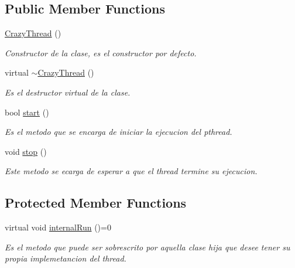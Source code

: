 \subsection*{Public Member Functions}
\begin{DoxyCompactItemize}
\item 
\hypertarget{class_crazy_thread_a0e0ca1644ff99dc033d11a58e0e54cd8}{\hyperlink{class_crazy_thread_a0e0ca1644ff99dc033d11a58e0e54cd8}{Crazy\-Thread} ()}\label{class_crazy_thread_a0e0ca1644ff99dc033d11a58e0e54cd8}

\begin{DoxyCompactList}\small\item\em Constructor de la clase, es el constructor por defecto. \end{DoxyCompactList}\item 
\hypertarget{class_crazy_thread_a46e62f5a5f328d329b5b14edc693fd77}{virtual \hyperlink{class_crazy_thread_a46e62f5a5f328d329b5b14edc693fd77}{$\sim$\-Crazy\-Thread} ()}\label{class_crazy_thread_a46e62f5a5f328d329b5b14edc693fd77}

\begin{DoxyCompactList}\small\item\em Es el destructor virtual de la clase. \end{DoxyCompactList}\item 
bool \hyperlink{class_crazy_thread_a2f355e56337c7f4b3f627633f51f9388}{start} ()
\begin{DoxyCompactList}\small\item\em Es el metodo que se encarga de iniciar la ejecucion del pthread. \end{DoxyCompactList}\item 
\hypertarget{class_crazy_thread_acd83eb404d4edc6db97f307aead10a32}{void \hyperlink{class_crazy_thread_acd83eb404d4edc6db97f307aead10a32}{stop} ()}\label{class_crazy_thread_acd83eb404d4edc6db97f307aead10a32}

\begin{DoxyCompactList}\small\item\em Este metodo se ecarga de esperar a que el thread termine su ejecucion. \end{DoxyCompactList}\end{DoxyCompactItemize}
\subsection*{Protected Member Functions}
\begin{DoxyCompactItemize}
\item 
\hypertarget{class_crazy_thread_ac55ecbf9e17716a6dd9acd3f22e4ad80}{virtual void \hyperlink{class_crazy_thread_ac55ecbf9e17716a6dd9acd3f22e4ad80}{internal\-Run} ()=0}\label{class_crazy_thread_ac55ecbf9e17716a6dd9acd3f22e4ad80}

\begin{DoxyCompactList}\small\item\em Es el metodo que puede ser sobrescrito por aquella clase hija que desee tener su propia implemetancion del thread. \end{DoxyCompactList}\end{DoxyCompactItemize}


